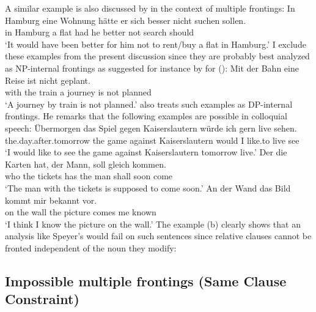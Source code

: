 A similar example is also discussed by \citet[]{Fanselow93a} in the context of multiple frontings:
\ea
\gll In Hamburg eine Wohnung hätte er sich besser nicht suchen sollen.\\
     in Hamburg a    flat    had  he \self{} better not search should\\
\glt `It would have been better for him not to rent/buy a flat in Hamburg.'
\z
I exclude these examples from the present discussion since they are probably best analyzed as
NP-internal frontings as suggested for instance by \citet[--69]{Fortmann96a-u} for ():
\ea
\gll Mit der Bahn eine Reise ist nicht geplant.\\
     with the train a journey is not planned\\
\glt `A journey by train is not planned.'
\z
\citet[]{Abb94} also treats such examples as DP-internal frontings. He remarks that the
following examples are possible in colloquial speech:
\eal
\ex 
\gll Übermorgen das Spiel gegen Kaiserslautern würde ich gern live sehen.\\
     the.day.after.tomorrow the game against Kaiserslautern would I like.to live see\\
\glt `I would like to see the game against Kaiserslautern tomorrow live.'
\ex 
\gll Der die Karten hat, der Mann, soll gleich kommen.\\
     who the tickets has the man shall soon come\\
\glt `The man with the tickets is supposed to come soon.'
\ex 
\gll An der Wand das Bild kommt mir bekannt vor.\\
     on the wall the picture comes me known \particle\\
\glt `I think I know the picture on the wall.'
\zl
The example (b) clearly shows that an analysis like Speyer's \citeyearpar{Speyer2008a} would
fail on such sentences since relative clauses cannot be fronted independent of the noun they modify:
\z



\subsection{Impossible multiple frontings (Same Clause Constraint)}
\label{sec-ausgeschlossen-mvf}\label{sec-clause-mates}

